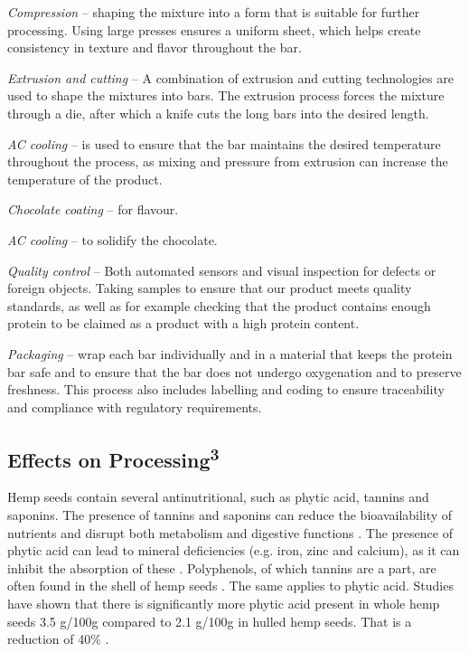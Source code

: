 \vspace{1em}
\textit{Compression} – shaping the mixture into a form that is suitable for further processing. Using large presses ensures a uniform sheet, which helps create consistency in texture and flavor throughout the bar.

\vspace{1em}
\textit{Extrusion and cutting} – A combination of extrusion and cutting technologies are used to shape the mixtures into bars. The extrusion process forces the mixture through a die, after which a knife cuts the long bars into the desired length.

\vspace{1em}
\textit{AC cooling} – is used to ensure that the bar maintains the desired temperature throughout the process, as mixing and pressure from extrusion can increase the temperature of the product.

\vspace{1em}
\textit{Chocolate coating} – for flavour.

\vspace{1em}
\textit{AC cooling} – to solidify the chocolate.

\vspace{1em}
\textit{Quality control} – Both automated sensors and visual inspection for defects or foreign objects. Taking samples to ensure that our product meets quality standards, as well as for example checking that the product contains enough protein to be claimed as a product with a high protein content. 

\vspace{1em}
\textit{Packaging} – wrap each bar individually and in a material that keeps the protein bar safe and to ensure that the bar does not undergo oxygenation and to preserve freshness. This process also includes labelling and coding to ensure traceability and compliance with regulatory requirements.

\subsection{Effects on Processing\textsuperscript{3}}
Hemp seeds contain several antinutritional, such as phytic acid, tannins and saponins. The presence of tannins and saponins can reduce the bioavailability of nutrients and disrupt both metabolism and digestive functions \cite*{HempBook}. The presence of phytic acid can lead to mineral deficiencies (e.g. iron, zinc and calcium), as it can inhibit the absorption of these \cite*{HempBook}.  Polyphenols, of which tannins are a part, are often found in the shell of hemp seeds \cite*{montero2023hemp}. The same applies to phytic acid. Studies have shown that there is significantly more phytic acid present in whole hemp seeds 3.5 g/100g compared to 2.1 g/100g in hulled hemp seeds. That is a reduction of 40\% \cite*{HempBook}.

